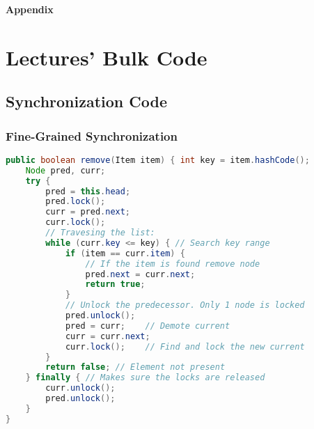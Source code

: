 \renewcommand{\image}[3]{\globimage{#1}{1}{#2}{#3}}
\renewcommand{\imagec}[4]{\globimagec{#1}{1}{#2}{#3}{#4}}
\renewcommand{\graphics}[2]{\texttt{[image: Images/appendix/\#1]}}
\par {\Huge \textbf{Appendix}}
\section{Lectures' Bulk Code}
\subsection{Synchronization Code}
\subsubsection{Fine-Grained Synchronization}\label{appendix:finesync1}
\begin{tcolorbox}[colback=nightblue!5!white, colframe=nightblue!75!black, title= Remove Method]
    \begin{lstlisting}[label={lst:finesync1}, language=Java, morekeywords={}]
public boolean remove(Item item) { int key = item.hashCode();
    Node pred, curr;
    try {
        pred = this.head;
        pred.lock();
        curr = pred.next;
        curr.lock();
        // Travesing the list:
        while (curr.key <= key) { // Search key range
            if (item == curr.item) { 
                // If the item is found remove node
                pred.next = curr.next;
                return true;
            }
            // Unlock the predecessor. Only 1 node is locked
            pred.unlock();
            pred = curr;    // Demote current
            curr = curr.next;
            curr.lock();    // Find and lock the new current
        }
        return false; // Element not present
    } finally { // Makes sure the locks are released
        curr.unlock();
        pred.unlock();
    }
}\end{lstlisting}
\end{tcolorbox}
%
\clearpage
%
\label{appendix:optisync1}
